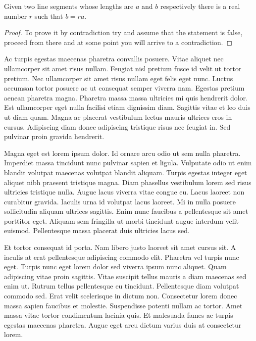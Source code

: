 \documentclass[12pt]{article}
\begin{document}
\begin{mylemma}
  Given two line segments whose lengths are \(a\) and \(b\) respectively there is a 
  real number \(r\) such that \(b=ra\).
\end{mylemma}

\begin{proof}
  To prove it by contradiction try and assume that the statement is false,
  proceed from there and at some point you will arrive to a contradiction.
\end{proof}

Ac turpis egestas maecenas pharetra convallis posuere. Vitae aliquet nec
ullamcorper sit amet risus nullam. Feugiat nisl pretium fusce id velit ut
tortor pretium. Nec ullamcorper sit amet risus nullam eget felis eget nunc.
Luctus accumsan tortor posuere ac ut consequat semper viverra nam. Egestas
pretium aenean pharetra magna. Pharetra massa massa ultricies mi quis
hendrerit dolor. Est ullamcorper eget nulla facilisi etiam dignissim diam.
Sagittis vitae et leo duis ut diam quam. Magna ac placerat vestibulum lectus
mauris ultrices eros in cursus. Adipiscing diam donec adipiscing tristique
risus nec feugiat in. Sed pulvinar proin gravida hendrerit.

Magna eget est lorem ipsum dolor. Id ornare arcu odio ut sem nulla pharetra.
Imperdiet massa tincidunt nunc pulvinar sapien et ligula. Vulputate odio ut
enim blandit volutpat maecenas volutpat blandit aliquam. Turpis egestas
integer eget aliquet nibh praesent tristique magna. Diam phasellus vestibulum
lorem sed risus ultricies tristique nulla. Augue lacus viverra vitae congue
eu. Lacus laoreet non curabitur gravida. Iaculis urna id volutpat lacus
laoreet. Mi in nulla posuere sollicitudin aliquam ultrices sagittis. Enim
nunc faucibus a pellentesque sit amet porttitor eget. Aliquam sem fringilla
ut morbi tincidunt augue interdum velit euismod. Pellentesque massa placerat
duis ultricies lacus sed.

Et tortor consequat id porta. Nam libero justo laoreet sit amet cursus sit. A
iaculis at erat pellentesque adipiscing commodo elit. Pharetra vel turpis
nunc eget. Turpis nunc eget lorem dolor sed viverra ipsum nunc aliquet. Quam
adipiscing vitae proin sagittis. Vitae suscipit tellus mauris a diam maecenas
sed enim ut. Rutrum tellus pellentesque eu tincidunt. Pellentesque diam
volutpat commodo sed. Erat velit scelerisque in dictum non. Consectetur lorem
donec massa sapien faucibus et molestie. Suspendisse potenti nullam ac
tortor. Amet massa vitae tortor condimentum lacinia quis. Et malesuada fames
ac turpis egestas maecenas pharetra. Augue eget arcu dictum varius duis at
consectetur lorem.
\end{document}

